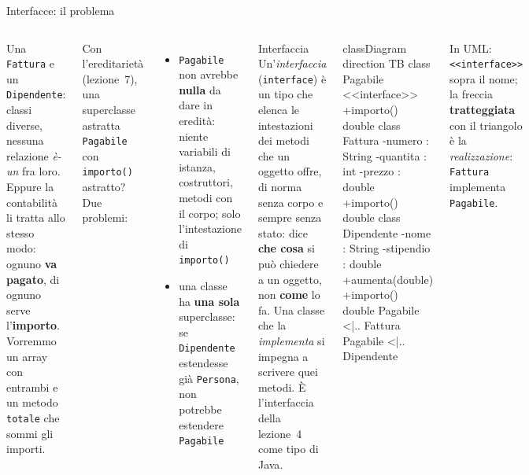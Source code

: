 \documentclass[10pt,aspectratio=169]{beamer}
\begin{document}
\begin{frame}[fragile]{Interfacce: il problema}
\begin{columns}[T]
\footnotesize
Una \texttt{Fattura} e un \texttt{Dipendente}: classi diverse, nessuna relazione \emph{è-un} fra loro. Eppure la contabilità li tratta allo stesso modo: ognuno \textbf{va pagato}, di ognuno serve l'\textbf{importo}. Vorremmo un array con entrambi e un metodo \texttt{totale} che sommi gli importi.

\vspace{0.1cm}
Con l'ereditarietà (lezione~7), una superclasse astratta \texttt{Pagabile} con \texttt{importo()} astratto? Due problemi:
\begin{itemize}\itemsep=2pt
    \item \texttt{Pagabile} non avrebbe \textbf{nulla} da dare in eredità: niente variabili di istanza, costruttori, metodi con il corpo; solo l'intestazione di \texttt{importo()}
    \item una classe ha \textbf{una sola} superclasse: se \texttt{Dipendente} estendesse già \texttt{Persona}, non potrebbe estendere \texttt{Pagabile}
\end{itemize}
\begin{block}{Interfaccia}
\small Un'\emph{interfaccia} (\texttt{interface}) è un tipo che elenca le intestazioni dei metodi che un oggetto offre, di norma senza corpo e sempre senza stato: dice \textbf{che cosa} si può chiedere a un oggetto, non \textbf{come} lo fa. Una classe che la \emph{implementa} si impegna a scrivere quei metodi. È l'interfaccia della lezione~4 come tipo di Java.
\end{block}

\begin{mermaid}
classDiagram
  direction TB
  class Pagabile {
    <<interface>>
    +importo() double
  }
  class Fattura {
    -numero : String
    -quantita : int
    -prezzo : double
    +importo() double
  }
  class Dipendente {
    -nome : String
    -stipendio : double
    +aumenta(double)
    +importo() double
  }
  Pagabile <|.. Fattura
  Pagabile <|.. Dipendente
\end{mermaid}
\footnotesize
In UML: \texttt{<<interface>>} sopra il nome; la freccia \textbf{tratteggiata} con il triangolo è la \emph{realizzazione}: \texttt{Fattura} implementa \texttt{Pagabile}.
\end{columns}
\end{frame}
\end{document}
